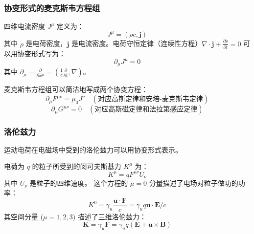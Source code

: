 \documentclass[fontset=none]{ctexart}
\begin{document}
\subsubsection{协变形式的麦克斯韦方程组}
\begin{definition}[四维电流密度]
四维电流密度 $J^{\mu}$ 定义为：
\begin{equation}
J^{\mu} = (\rho c, \bm{j})
\end{equation}
其中 $\rho$ 是电荷密度，$\bm{j}$ 是电流密度。电荷守恒定律（连续性方程）$\nabla\cdot\bm{j} + \frac{\partial\rho}{\partial t} = 0$ 可以用协变形式写为：
\begin{equation}
\partial_{\mu}J^{\mu} = 0
\end{equation}
其中 $\partial_{\mu} = \frac{\partial}{\partial x^{\mu}} = (\frac{1}{c}\frac{\partial}{\partial t}, \nabla)$。
\end{definition}
\begin{theorem}[协变形式的麦克斯韦方程组]
麦克斯韦方程组可以简洁地写成两个协变方程：
\begin{equation}
\partial_{\mu}F^{\mu\nu} = \mu_0 J^{\nu} \quad (\text{对应高斯定律和安培-麦克斯韦定律})
\end{equation}
\begin{equation}
\partial_{\mu}G^{\mu\nu} = 0 \quad (\text{对应高斯磁定律和法拉第感应定律})
\end{equation}
\end{theorem}

\subsubsection{洛伦兹力}
运动电荷在电磁场中受到的洛伦兹力可以用协变形式表示。
\begin{proposition}[协变洛伦兹力]
电荷为 $q$ 的粒子所受到的闵可夫斯基力 $K^{\mu}$ 为：
\begin{equation}
K^{\mu} = q F^{\mu\nu}U_{\nu}
\end{equation}
其中 $U_{\nu}$ 是粒子的四维速度。
这个方程的 $\mu=0$ 分量描述了电场对粒子做功的功率：
\begin{equation}
K^0 = \gamma_u \frac{\bm{u}\cdot\bm{F}}{c} = \gamma_u q \bm{u}\cdot\bm{E} / c
\end{equation}
其空间分量 ($\mu=1,2,3$) 描述了三维洛伦兹力：
\begin{equation}
\bm{K} = \gamma_u \bm{F} = \gamma_u q(\bm{E} + \bm{u} \times \bm{B})
\end{equation}
\end{proposition}
\end{document}
